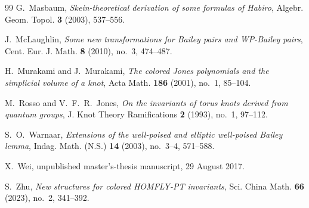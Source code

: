 \documentclass[11pt]{amsart}
\begin{document}
\begin{thebibliography}{99}
G.~Masbaum,
\emph{Skein-theoretical derivation of some formulas of Habiro},
Algebr. Geom. Topol. \textbf{3} (2003), 537--556.

J.~McLaughlin,
\emph{Some new transformations for Bailey pairs and WP-Bailey pairs},
Cent. Eur. J. Math. \textbf{8} (2010), no.~3, 474--487.

H.~Murakami and J.~Murakami,
\emph{The colored Jones polynomials and the simplicial volume of a
knot},
Acta Math. \textbf{186} (2001), no.~1, 85--104.

M.~Rosso and V.~F.~R.~Jones,
\emph{On the invariants of torus knots derived from quantum groups},
J. Knot Theory Ramifications \textbf{2} (1993), no.~1, 97--112.

S.~O.~Warnaar,
\emph{Extensions of the well-poised and elliptic well-poised Bailey
lemma},
Indag. Math. (N.S.) \textbf{14} (2003), no.~3--4, 571--588.

X.~Wei,
unpublished master's-thesis manuscript, 29 August 2017.

S.~Zhu,
\emph{New structures for colored HOMFLY-PT invariants},
Sci. China Math. \textbf{66} (2023), no.~2, 341--392.

\end{thebibliography}
\end{document}
